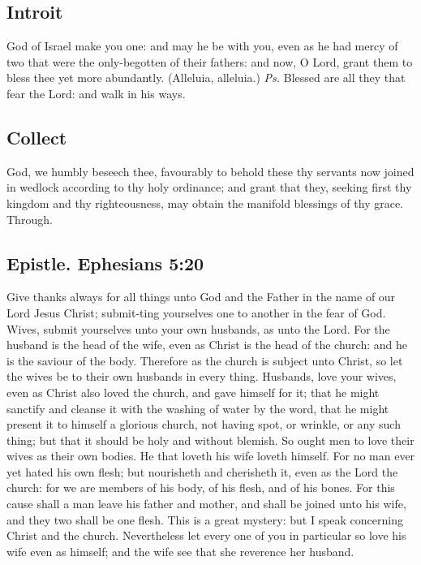 \subsection{Introit}
 God of Israel make you one: and may he be with you, even as he had mercy of two that were the only-begotten of their fathers: and now, O Lord, grant them to bless thee yet more abundantly. (Alleluia, alleluia.) \textit{Ps.} Blessed are all they that fear the Lord: and walk in his ways.

\subsection{Collect}
 God, we humbly beseech thee, favourably to behold these thy servants now joined in wedlock according to thy holy ordinance; and grant that they, seeking first thy kingdom and thy righteousness, may obtain the manifold blessings of thy grace. Through.
 
\subsection{Epistle. {\normalfont Ephesians 5:20}}
 Give thanks always for all things unto God and the Father in the name of our Lord Jesus Christ; submit-ting yourselves one to another in the fear of God. Wives, submit yourselves unto your own husbands, as unto the Lord. For the husband is the head of the wife, even as Christ is the head of the church: and he is the saviour of the body. Therefore as the church is subject unto Christ, so let the wives be to their own husbands in every thing. Husbands, love your wives, even as Christ also loved the church, and gave himself for it; that he might sanctify and cleanse it with the washing of water by the word, that he might present it to himself a glorious church, not having spot, or wrinkle, or any such thing; but that it should be holy and without blemish. So ought men to love their wives as their own bodies. He that loveth his wife loveth himself. For no man ever yet hated his own flesh; but nourisheth and cherisheth it, even as the Lord the church: for we are members of his body, of his flesh, and of his bones. For this cause shall a man leave his father and mother, and shall be joined unto his wife, and they two shall be one flesh. This is a great mystery: but I speak concerning Christ and the church. Nevertheless let every one of you in particular so love his wife even as himself; and the wife see that she reverence her husband.

